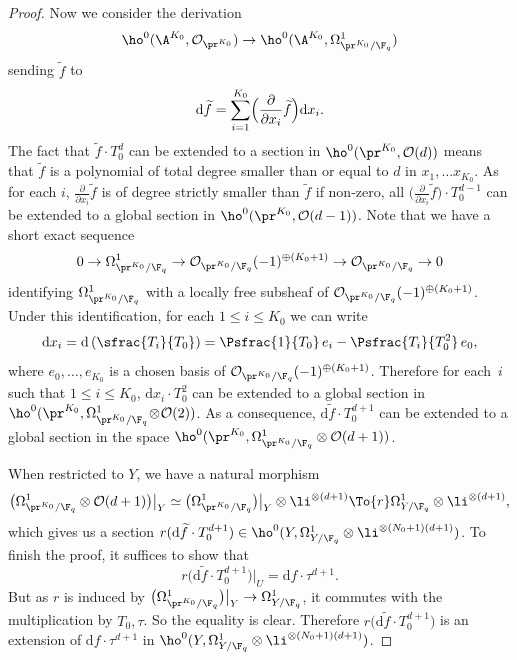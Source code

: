 \begin{proof}[Proof]
Now we consider the derivation
\[
\ho^0(\A^{K_0},\mathcal{O}_{\pr^{K_0}}) \to \ho^0(\A^{K_0},\Omega_{\pr^{K_0}/\F_q}^1)
\]
sending $\widetilde{f}$ to
\[
\mathrm{d}\widetilde{f}=\sum_{i=1}^{K_0}\Bigl(\frac{\partial}{\partial x_i}\widetilde{f}\Bigr) \mathrm{d}x_i.
\]
The fact that $\widetilde{f}\cdot T_0^d$ can be extended to a section in $\ho^0(\pr^{K_0},\mathcal{O}(d))$ means that $\widetilde{f}$ is a polynomial of total degree smaller than or equal to $d$ in $x_1,\dots x_{K_0}$. As for each $i$, $\frac{\partial}{\partial x_i}\widetilde{f}$ is of degree strictly smaller than $\widetilde{f}$ if non-zero, all $\bigl(\frac{\partial}{\partial x_i}\widetilde{f}\bigr)\cdot T_0^{d-1}$ can be extended to a global section in $\ho^0(\pr^{K_0},\mathcal{O}(d-1))$. Note that we have a short exact sequence
\[
0\to \Omega_{\pr^{K_0}/\F_q}^1 \to \mathcal{O}_{\pr^{K_0}/\F_q}(-1)^{\oplus (K_0+1)} \to \mathcal{O}_{\pr^{K_0}/\F_q} \to 0
\]
identifying $\Omega_{\pr^{K_0}/\F_q}^1$ with a locally free subsheaf of $\mathcal{O}_{\pr^{K_0}/\F_q}(-1)^{\oplus (K_0+1)}$. Under this identification, for each $1\leq i\leq K_0$ we can write
\[
\mathrm{d}x_i=\mathrm{d} \left(\sfrac{T_i}{T_0} \right)=\Psfrac{1}{T_0}\,e_i-\Psfrac{T_i}{T_0^2}\,e_0,
\]
where $e_0,\dots, e_{K_0}$ is a chosen basis of $ \mathcal{O}_{\pr^{K_0}/\F_q}(-1)^{\oplus (K_0+1)} $. Therefore for each~$i$ such that $1\!\leq\! i\!\leq\! K_0$, $\mathrm{d} x_i\cdot T_0^2$ can be extended to a global section in \hbox{$\ho^0(\pr^{K_0},\Omega_{\pr^{K_0}/\F_q}^1\!\otimes\!\mathcal{O}(2))$}. As a consequence, $\mathrm{d}\widetilde{f}\cdot T_0^{d+1}$ can be extended to a global section in the space \hbox{$\ho^0(\pr^{K_0},\Omega_{\pr^{K_0}/\F_q}^1\otimes \mathcal{O}(d+1))$}.

When restricted to $Y$, we have a natural morphism
\[
\bigl(\Omega_{\pr^{K_0}/\F_q}^1\otimes \mathcal{O}(d+1)\bigr)\big|_Y\simeq \bigl(\Omega_{\pr^{K_0}/\F_q}^1\bigr)\big|_Y\otimes \li^{\otimes(d+1)}\To{r} \Omega_{Y/\F_q}^1\otimes \li^{\otimes(d+1)},
\]
which gives us a section $r(\mathrm{d}\widetilde{f}\cdot T_0^{d+1})\in \ho^0(Y, \Omega_{Y/\F_q}^1\otimes \li^{\otimes(N_0+1)(d+1)})$. To finish the proof, it suffices to show that
\[
r\bigl(\mathrm{d}\widetilde{f}\cdot T_0^{d+1}\bigr)\big|_U=\mathrm{d}f\cdot \tau^{d+1}.
\]
But as $r$ is induced by $\bigl(\Omega_{\pr^{K_0}/\F_q}^1\bigr)\big|_Y\to \Omega_{Y/\F_q}^1$, it commutes with the multiplication by $T_0, \tau$. So the equality is clear. Therefore $r\bigl(\mathrm{d}\widetilde{f}\cdot T_0^{d+1}\bigr)$ is an extension of $\mathrm{d}f\cdot \tau^{d+1}$ in $\ho^0(Y, \Omega_{Y/\F_q}^1\otimes \li^{\otimes(N_0+1)(d+1)})$.
\end{proof}

